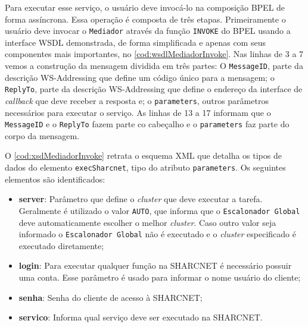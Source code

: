 \documentclass[12pt]{report} %
\begin{document}
	Para executar esse serviço, o usuário deve invocá-lo na composição BPEL de forma assíncrona.
	Essa operação é composta de três etapas.
	Primeiramente o usuário deve invocar o \texttt{Mediador} através da função \texttt{INVOKE} do BPEL usando a interface WSDL demonstrada, de forma simplificada e apenas com seus componentes mais importantes, no \autoref{cod:wsdlMediadorInvoke}.
	Nas linhas de 3 a 7 vemos a construção da mensagem dividida em três partes: O \texttt{MessageID}, parte da descrição WS-Addressing que define um código único para a mensagem; o \texttt{ReplyTo}, parte da descrição WS-Addressing que define o endereço da interface de \textit{callback} que deve receber a resposta e; o \texttt{parameters}, outros parâmetros necessários para executar o serviço.
	As linhas de 13 a 17 informam que o \texttt{MessageID} e o \texttt{ReplyTo} fazem parte co cabeçalho e o \texttt{parameters} faz parte do corpo da mensagem.
	
 	    

	O \autoref{cod:xsdMediadorInvoke} retrata o esquema XML que detalha os tipos de dados do elemento \texttt{execSharcnet}, tipo do atributo \texttt{parameters}.
	Os seguintes elementos são identificados:
	
	\begin{itemize}
	 \item \textbf{server}: Parâmetro que define o \textit{cluster} que deve executar a tarefa. Geralmente é utilizado o valor \texttt{AUTO}, que informa que o \texttt{Escalonador Global} deve automaticamente escolher o melhor \textit{cluster}. Caso outro valor seja informado o \texttt{Escalonador Global} não é executado e o \textit{cluster} especificado é executado diretamente;
	 \item \textbf{login}: Para executar qualquer função na SHARCNET é necessário possuir uma conta. Esse parâmetro é usado para informar o nome usuário do cliente;
	 \item \textbf{senha}: Senha do cliente de acesso à SHARCNET;
	 \item \textbf{servico}: Informa qual serviço deve ser executado na SHARCNET.	 
	\end{itemize}	
	
\end{document}
